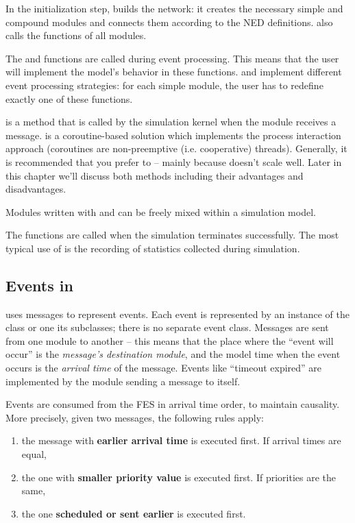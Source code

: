 In the initialization step, {\opp} builds the network: it creates the
necessary simple and compound modules and
connects them according to the NED definitions. {\opp} also calls the
 functions of all modules.

The  and  functions are
called during event processing. This means that the user will
implement the model's behavior in these functions.
 and  implement
different event processing strategies: for each simple module, the user
has to redefine exactly one of these functions.

 is a method that is called
by the simulation kernel when the module receives a message.
 is a coroutine-based solution
which implements the process interaction approach (coroutines are
non-preemptive (i.e. cooperative) threads). Generally, it is recommended
that you prefer  to  --
mainly because  doesn't scale well.
Later in this chapter we'll discuss both methods including their advantages
and disadvantages.

Modules written with  and 
can be freely mixed within a simulation model.

The  functions are called when the simulation
terminates successfully. The most typical use of 
is the recording of statistics collected during simulation.



\subsection{Events in {\opp}}
\label{sec:simple-modules:events-in-opp}

{\opp} uses messages to represent
events. Each event is represented by an instance of the
 class or one its subclasses; there is no separate
event class. Messages are sent from one module to another -- this
means that the place where the ``event will occur'' is the
\textit{message's destination module}, and the model time when the
event occurs is the \textit{arrival time} of the
message. Events like ``timeout expired'' are implemented by the
module sending a message to itself.

Events are consumed from the FES in arrival time order, to
maintain causality. More precisely, given two messages, the following
rules apply:
\begin{enumerate}
\item{the message with \textbf{earlier arrival time} is executed
    first.  If arrival times are equal,}
\item{the one with \textbf{smaller priority value} is executed first.
    If priorities are the same,}
\item{the one \textbf{scheduled or sent earlier} is executed first.}
\end{enumerate}

